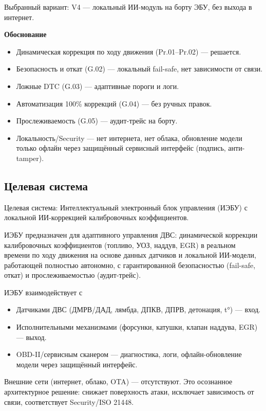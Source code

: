 \documentclass[14pt, a4paper]{extarticle}
\begin{document}
		Выбранный вариант: V4 — локальный ИИ-модуль на борту ЭБУ, без выхода в интернет.
		
		\textbf{Обоснование}
		\begin{itemize}
			\item Динамическая коррекция по ходу движения (Pr.01–Pr.02) — решается.
			\item Безопасность и откат (G.02) — локальный fail-safe, нет зависимости от связи.
			\item Ложные DTC (G.03) — адаптивные пороги и логи.
			\item Автоматизация 100\% коррекций (G.04) — без ручных правок.
			\item Прослеживаемость (G.05) — аудит-трейс на борту.
			\item Локальность/Security — нет интернета, нет облака, обновление модели только офлайн через защищённый сервисный интерфейс (подпись, анти-tamper).
		\end{itemize}
	
	\subsection{Целевая система}
		
		Целевая система: Интеллектуальный электронный блок управления (ИЭБУ) с локальной ИИ-коррекцией калибровочных коэффициентов.
		
		ИЭБУ предназначен для адаптивного управления ДВС: динамической коррекции калибровочных коэффициентов (топливо, УОЗ, наддув, EGR) в реальном времени по ходу движения на основе данных датчиков и локальной ИИ-модели, работающей полностью автономно, с гарантированной безопасностью (fail-safe, откат) и прослеживаемостью (аудит-трейс).
		
		ИЭБУ взаимодействует с
		\begin{itemize}
			\item Датчиками ДВС (ДМРВ/ДАД, лямбда, ДПКВ, ДПРВ, детонация, t°) — вход.
			\item Исполнительными механизмами (форсунки, катушки, клапан наддува, EGR) — выход.
			\item OBD-II/сервисным сканером — диагностика, логи, офлайн-обновление модели через защищённый интерфейс.
		\end{itemize}
		
		Внешние сети (интернет, облако, OTA) — отсутствуют. Это осознанное архитектурное решение: снижает поверхность атаки, исключает зависимость от связи, соответствует Security/ISO 21448.
		
\end{document}
